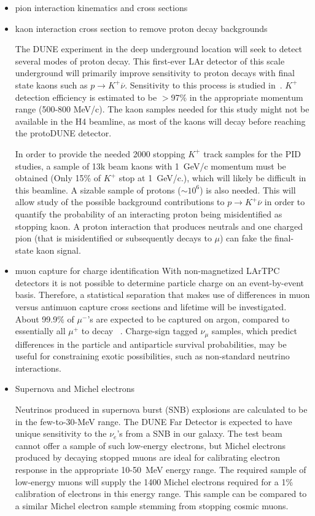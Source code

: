 \begin{itemize}
\item pion interaction kinematics and cross sections
\item kaon interaction cross section to remove proton decay backgrounds


The DUNE experiment in the deep underground location will seek to detect several modes of proton decay.
This first-ever LAr detector of this scale underground will primarily improve sensitivity to 
proton decays with final state kaons such as  ${p \rightarrow K^+ \overline{\nu}}$. 
Sensitivity to this process is studied in~\cite{bueno}. $K^+$ detection efficiency is estimated to be $>$97\% in the
appropriate momentum range (500-800 MeV/c). The kaon samples needed for this study might not be available in the H4 beamline, as most of the kaons will decay before reaching the protoDUNE detector. 

In order to provide the needed 2000 stopping $K^+$ track samples for the PID studies, a sample of 13k beam kaons with 1~GeV/c momentum must be obtained (Only 15\% of $K^+$ stop at 1~GeV/c.), which will likely be difficult in this beamline. 
A sizable sample of protons ($\sim 10^6$)
is also needed. This will allow study of the possible background contributions to $p \rightarrow K^+ \overline{\nu}$ in order to quantify the probability of an interacting proton 
being misidentified as stopping kaon. A proton interaction that produces neutrals and one charged pion 
(that is misidentified or subsequently decays to $\mu$) can fake the final-state kaon signal.

\item muon capture for charge identification
With non-magnetized LArTPC detectors it is not possible to determine particle charge on an event-by-event basis. Therefore, a statistical separation that makes use of differences in muon versus antimuon capture cross sections and lifetime will be investigated.
About 99.9\% of $\mu^-$'s are expected to be captured on argon, compared to essentially all $\mu^+$ to decay ~\cite{stopmu}.
Charge-sign tagged $\nu_\mu$ samples, which predict differences in the particle and antiparticle survival probabilities, may be useful for constraining exotic possibilities, such as non-standard neutrino interactions. 


\item Supernova and Michel electrons

Neutrinos produced in supernova burst (SNB) explosions are calculated to be in the few-to-30-MeV range.
The DUNE Far Detector is expected to have unique sensitivity to the $\nu_e$'s from a SNB in our galaxy.
%
The test beam cannot offer a sample of  such low-energy electrons, but Michel electrons  produced by 
decaying stopped muons are ideal for calibrating electron response in the appropriate 10-50~MeV energy range. 
The required  sample of low-energy muons will supply the 1400 Michel electrons required for a 1\% 
calibration of electrons in this energy range. This sample can be compared to a similar Michel electron sample
stemming from stopping cosmic muons.

\end{itemize}



